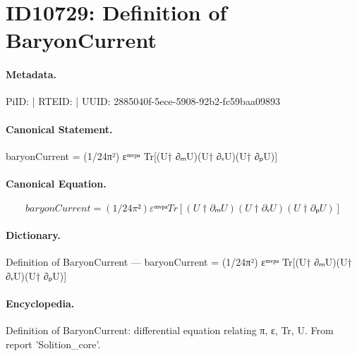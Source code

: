 \section*{ID10729: Definition of BaryonCurrent}
\paragraph{Metadata.}
PiID:  | RTEID:  | UUID: 2885040f-5ece-5908-92b2-fc59baa09893

\paragraph{Canonical Statement.}
baryonCurrent = (1/24π²) εᵐᵛᵖᵃ Tr[(U† ∂ₘU)(U† ∂ᵥU)(U† ∂ₚU)]

\paragraph{Canonical Equation.}
\[
baryonCurrent = (1/24π²) εᵐᵛᵖᵃ Tr[(U† ∂ₘU)(U† ∂ᵥU)(U† ∂ₚU)]
\]

\paragraph{Dictionary.}
Definition of BaryonCurrent — baryonCurrent = (1/24π²) εᵐᵛᵖᵃ Tr[(U† ∂ₘU)(U† ∂ᵥU)(U† ∂ₚU)]

\paragraph{Encyclopedia.}
Definition of BaryonCurrent: differential equation relating π, ε, Tr, U. From report 'Solition\_core'.
